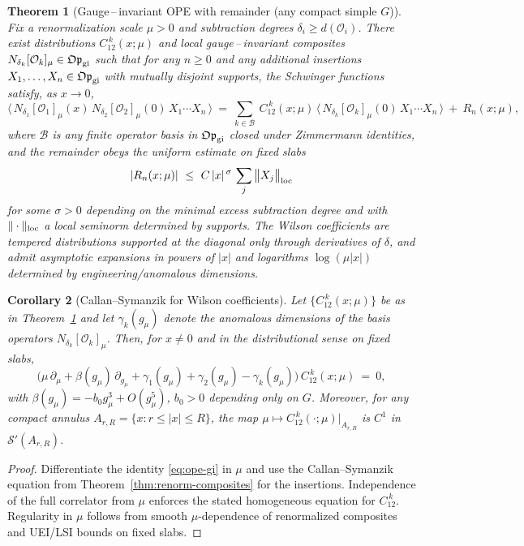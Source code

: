\documentclass[11pt]{amsart}
\theoremstyle{plain}
\newtheorem{theorem}{Theorem}[section]
\newtheorem{corollary}[theorem]{Corollary}
\theoremstyle{definition}
\theoremstyle{remark}
\begin{document}
\begin{theorem}[Gauge\,–\,invariant OPE with remainder (any compact simple $G$)]\label{thm:ope-gi}
Fix a renormalization scale $\mu>0$ and subtraction degrees $\delta_i\ge d(\mathcal O_i)$. There exist distributions $C^{\,k}_{12}(x;\mu)$ and local gauge\,–\,invariant composites $N_{\delta_k}[\mathcal O_k]_\mu\in\mathfrak{Op}_{\rm gi}$ such that for any $n\ge 0$ and any additional insertions $X_1,\dots,X_n\in\mathfrak{Op}_{\rm gi}$ with mutually disjoint supports, the Schwinger functions satisfy, as $x\to 0$,
\begin{equation}\label{eq:ope-gi}
  \big\langle\, N_{\delta_1}[\mathcal O_1]_\mu(x)\, N_{\delta_2}[\mathcal O_2]_\mu(0)\, X_1\cdots X_n\,\big\rangle
  \ =\ \sum_{k\in\mathcal B}\ C^{\,k}_{12}(x;\mu)\,\big\langle\, N_{\delta_k}[\mathcal O_k]_\mu(0)\, X_1\cdots X_n\,\big\rangle\ +\ R_n(x;\mu),
\end{equation}
where $\mathcal B$ is any finite operator basis in $\mathfrak{Op}_{\rm gi}$ closed under Zimmermann identities, and the remainder obeys the uniform estimate on fixed slabs
\[
  |R_n(x;\mu)|\ \le\ C\, |x|^{\,\sigma}\,\sum_{j}\big\|X_j\big\|_{\rm loc}
\]
for some $\sigma>0$ depending on the minimal excess subtraction degree and with $\|\cdot\|_{\rm loc}$ a local seminorm determined by supports. The Wilson coefficients are tempered distributions supported at the diagonal only through derivatives of $\delta$, and admit asymptotic expansions in powers of $|x|$ and logarithms $\log(\mu |x|)$ determined by engineering/anomalous dimensions.
\end{theorem}
\begin{corollary}[Callan--Symanzik for Wilson coefficients]\label{cor:cs-wilson}
Let $\{C^{\,k}_{12}(x;\mu)\}$ be as in Theorem~\ref{thm:ope-gi} and let $\gamma_k(g_\mu)$ denote the anomalous dimensions of the basis operators $N_{\delta_k}[\mathcal O_k]_\mu$. Then, for $x\ne 0$ and in the distributional sense on fixed slabs,
\[
  \Big(\mu\,\partial_\mu + \beta(g_\mu)\,\partial_{g_\mu} + \gamma_1(g_\mu)+\gamma_2(g_\mu) - \gamma_k(g_\mu)\Big)\,C^{\,k}_{12}(x;\mu)\ =\ 0,
\]
with $\beta(g_\mu)=-b_0 g_\mu^3+O(g_\mu^5)$, $b_0>0$ depending only on $G$. Moreover, for any compact annulus $A_{r,R}=\{x: r\le |x|\le R\}$, the map $\mu\mapsto C^{\,k}_{12}(\cdot;\mu)|_{A_{r,R}}$ is $C^1$ in $\mathcal S'(A_{r,R})$.
\end{corollary}
\begin{proof}
Differentiate the identity \eqref{eq:ope-gi} in $\mu$ and use the Callan--Symanzik equation from Theorem~\ref{thm:renorm-composites} for the insertions. Independence of the full correlator from $\mu$ enforces the stated homogeneous equation for $C^{\,k}_{12}$. Regularity in $\mu$ follows from smooth $\mu$-dependence of renormalized composites and UEI/LSI bounds on fixed slabs.
\end{proof}
\end{document}
